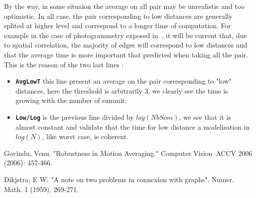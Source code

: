 \documentclass[a4paper]{article}
\begin{document}
By the way, in some situaion the average on all pair may be unrealistic and too optimistic.
In all case, the pair corresponding to low distances are generally splited at higher level
and correspond to a longer time of computation.
For example in the case  of photogrammetry exposed in~\cite{Govin2006}, it will be current
that, due to spatial correlation, the majority of edges will correspond to low distances and
that the average time is more important that predicted when taking all the pair.
This is the reason of the two last lines :

\begin{itemize}
    \item {\tt \bf  AvgLowT}  this line present an average on the pair corresponding to "low" distances,
         here the threshold is arbitrarily $3$, we clearly see the time is growing with the number of summit;

    \item {\tt \bf  Low/Log}  is the previous line divided by $log(NbSom)$, we see that it is almost constant
          and validate that the time for low distance a modelisation in $log(N)$, like worst case, is coherent.
\end{itemize}


\begin{thebibliography}{References}
          Govindu, Venu. "Robustness in Motion Averaging." Computer Vision–ACCV 2006 (2006): 457-466.

      Dikjstra, E W. "A note on two problems in connexion with graphs". 
           Numer. Math. 1 (1959), 269-271.
\end{thebibliography}
\end{document}
